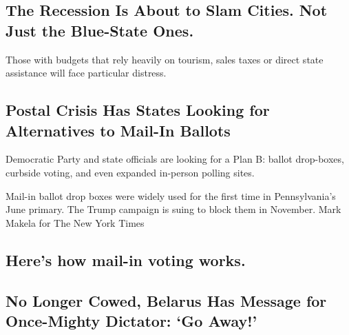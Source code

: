 \href{/2020/08/17/upshot/pandemic-recession-cities-fiscal-shortfall.html}{}

\href{/2020/08/17/upshot/pandemic-recession-cities-fiscal-shortfall.html}{}

\hypertarget{the-recession-is-about-to-slam-cities-not-just-the-blue-state-ones}{%
\subsection{The Recession Is About to Slam Cities. Not Just the
Blue-State
Ones.}\label{the-recession-is-about-to-slam-cities-not-just-the-blue-state-ones}}

Those with budgets that rely heavily on tourism, sales taxes or direct
state assistance will face particular distress.

\href{/2020/08/17/us/politics/postal-service-voting.html}{}

\hypertarget{postal-crisis-has-states-looking-for-alternatives-to-mail-in-ballots}{%
\subsection{Postal Crisis Has States Looking for Alternatives to Mail-In
Ballots}\label{postal-crisis-has-states-looking-for-alternatives-to-mail-in-ballots}}

Democratic Party and state officials are looking for a Plan B: ballot
drop-boxes, curbside voting, and even expanded in-person polling sites.

\href{/2020/08/17/us/politics/postal-service-voting.html}{}

\href{/2020/08/17/us/politics/postal-service-voting.html}{}

Mail-in ballot drop boxes were widely used for the first time in
Pennsylvania's June primary. The Trump campaign is suing to block them
in November. Mark Makela for The New York Times

\href{/article/Vote-by-mail.html}{}

\hypertarget{heres-how-mail-in-voting-works}{%
\subsection{Here's how mail-in voting
works.}\label{heres-how-mail-in-voting-works}}

\href{/2020/08/17/world/europe/belarus-lukashenko-protests.html}{}

\hypertarget{no-longer-cowed-belarus-has-message-for-once-mighty-dictator-go-away}{%
\subsection{No Longer Cowed, Belarus Has Message for Once-Mighty
Dictator: `Go
Away!'}\label{no-longer-cowed-belarus-has-message-for-once-mighty-dictator-go-away}}

